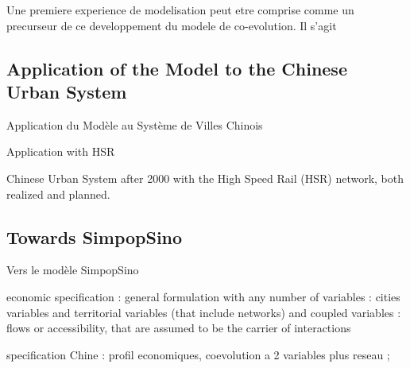 Une premiere experience de modelisation peut etre comprise comme un precurseur de ce developpement du modele de co-evolution. Il s'agit












\subsection{Application of the Model to the Chinese Urban System}{Application du Modèle au Système de Villes Chinois}


Application with HSR

Chinese Urban System after 2000 with the High Speed Rail (HSR) network, both realized and planned.








\subsection{Towards SimpopSino}{Vers le modèle SimpopSino}


economic specification : general formulation with any number of variables : cities variables and territorial variables (that include networks) and coupled variables : flows or accessibility, that are assumed to be the carrier of interactions

specification Chine : profil economiques, coevolution a 2 variables plus reseau ; 














